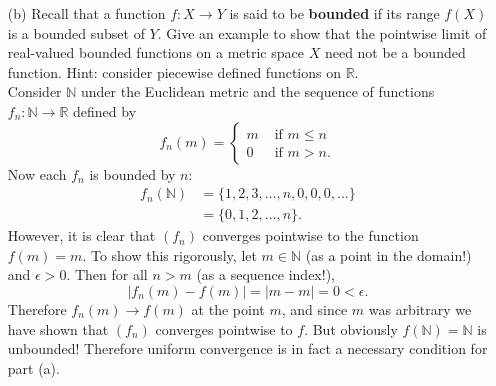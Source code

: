 \documentclass[12pt,twoside]{article}
\newcommand{\R}{\mathbb R} %
\newcommand{\N}{\mathbb N} %
\newenvironment{example}{\noindent {\em Example:} }{\bigskip}
\begin{document}
\begin{enumerate}
\begin{itemize}
\begin{proof} Let $X$ be a metric space and $f_n: X\to\R$ be a sequence of bounded functions that converges uniformly to $f$. To show that $f$ is bounded we need to show that the range $f(X)=\{f(x): x\in X\}$ is bounded in $\R$, and to do so we will use the characterization given in Corollary 3.1.14. Explicitly, we will show that there exists $M\in\R$ such that $|f(x)|\le M$ for all elements $f(x)\in f(X).$ We will need to use the uniform convergence assumption, so let $\epsilon=64$. Since $(f_n)$ converges uniformly to $f$, we can choose $N\in\N$ so that for all $n>N$ and all $x\in X$, $ |f_n(x)-f(x)| < 64$. Now fix an $n>N$. Since $f_n$ is bounded, by Corollary 3.1.14 there exists $K\in\R$ such that $|f_n(x)|\le K$ for all $x\in X$. Then for any $x\in X$,
\begin{align*} |f(x)| = |f(x)-0| &\le |f(x)-f_n(x)| + |f_n(x) - 0|\\
					&<64+|f_n(x)|\\
					&\le 64+K.
\end{align*} Therefore $|f(x)| \le 64+K$ for all $x\in X$, so $f(X)$ is bounded in $\R$. By definition, $f$ is bounded.
\end{proof}

\item[(b)] Recall that a function $f:X\to Y$ is said to be
\textbf{bounded} if its range $f(X)$ is a bounded subset of $Y$.
Give an example to show that the pointwise limit of real-valued
bounded functions on a metric space $X$ need not be a bounded
function.  Hint: consider piecewise defined functions on
$\mathbb{R}$.\\

\begin{example} Consider $\N$ under the Euclidean metric and the sequence of functions $f_n:\N\to\R$ defined by
$$f_n(m) = \begin{cases} m & \text{ if } m\le n\\
					0 & \text{ if } m>n. \end{cases}$$
Now each $f_n$ is bounded by $n$:
\begin{align*} f_n(\N) &= \{1, 2, 3, \ldots, n, 0 , 0,0,...\}\\ &= \{0,1,2,\ldots,n\}.\end{align*}
However, it is clear that $(f_n)$ converges pointwise to the function $f(m)=m.$ To show this rigorously, let $m\in\N$ (as a point in the domain!) and $\epsilon>0$. Then for all $n>m$ (as a sequence index!),
$$|f_n(m)- f(m)| = |m-m| = 0 < \epsilon.$$
Therefore $f_n(m) \to f(m)$ at the point $m$, and since $m$ was arbitrary we have shown that $(f_n)$ converges pointwise to $f$. But obviously $f(\N)=\N$ is unbounded! Therefore uniform convergence is in fact a necessary condition for part (a).\\


\end{example}
\end{itemize}
\end{enumerate}
\end{document}
